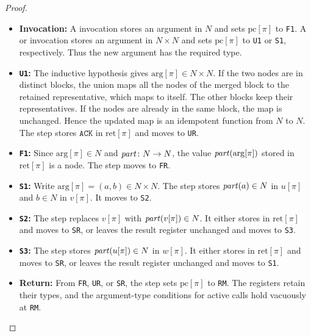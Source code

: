 \documentclass[12pt]{amsproc}
\begin{document}
\begin{enumerate}
\begin{proof}
    \begin{itemize}
        \item \textbf{Invocation:}
        A \Find{} invocation stores an argument in $N$ and sets $\mathrm{pc}[\pi]$ to \texttt{F1}. A \Unite{} or \SameSet{} invocation stores an argument in $N\times N$ and sets $\mathrm{pc}[\pi]$ to \texttt{U1} or \texttt{S1}, respectively. Thus the new argument has the required type. 

        \item \textbf{\texttt{U1}:}
        The inductive hypothesis gives $\mathrm{arg}[\pi]\in N\times N$. If the two nodes are in distinct blocks, the union maps all the nodes of the merged block to the retained representative, which maps to itself. The other blocks keep their representatives. If the nodes are already in the same block, the map is unchanged. Hence the updated map is an idempotent function from $N$ to $N$. The step stores $\texttt{ACK}$ in $\mathrm{ret}[\pi]$ and moves to \texttt{UR}.

        \item \textbf{\texttt{F1}:}
        Since $\mathrm{arg}[\pi]\in N$ and $\mathit{part}\colon N\to N$, the value $\mathit{part}(\mathrm{arg}[\pi])$ stored in $\mathrm{ret}[\pi]$ is a node. The step moves to \texttt{FR}.

        \item \textbf{\texttt{S1}:}
        Write $\mathrm{arg}[\pi]=(a,b)\in N\times N$. The step stores $\mathit{part}(a)\in N$ in $u[\pi]$ and $b\in N$ in $v[\pi]$. It moves to \texttt{S2}. 

        \item \textbf{\texttt{S2}:}
        The step replaces $v[\pi]$ with $\mathit{part}(v[\pi])\in N$. It either stores \True{} in $\mathrm{ret}[\pi]$ and moves to \texttt{SR}, or leaves the result register unchanged and moves to \texttt{S3}. 

        \item \textbf{\texttt{S3}:}
        The step stores $\mathit{part}(u[\pi])\in N$ in $w[\pi]$. It either stores \False{} in $\mathrm{ret}[\pi]$ and moves to \texttt{SR}, or leaves the result register unchanged and moves to \texttt{S1}. 

        \item \textbf{Return:}
        From \texttt{FR}, \texttt{UR}, or \texttt{SR}, the step sets $\mathrm{pc}[\pi]$ to \texttt{RM}. The registers retain their types, and the argument-type conditions for active calls hold vacuously at \texttt{RM}.
    \end{itemize}


\end{proof}
\end{enumerate}
\end{document}
